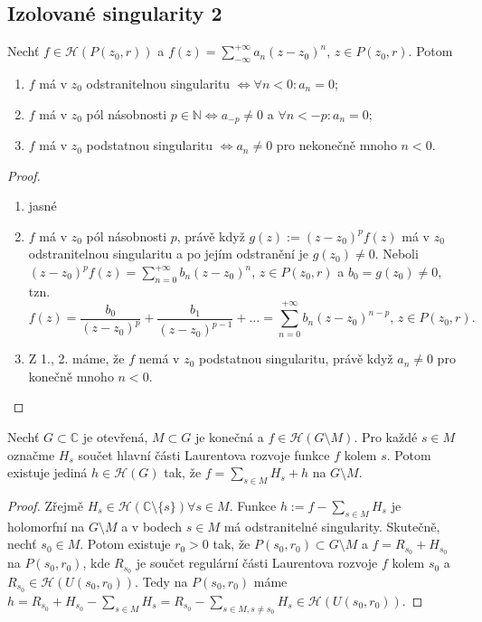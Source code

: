 \subsection{Izolované singularity 2}
\begin{theorem}
Nechť $f \in \mathcal{H}(P(z_0,r))$ a $f(z)=\sum\limits_{-\infty}^{+\infty}a_n(z-z_0)^n$, $z \in P(z_0,r)$. Potom
\begin{enumerate}
    \item $f$ má v $z_0$ odstranitelnou singularitu $\Leftrightarrow \forall n<0: a_n=0$; 
    \item $f$ má v $z_0$ pól násobnosti $p \in \mathbb{N}\Leftrightarrow a_{-p} \neq 0$ a $\forall n<-p: a_n=0$; 
    \item $f$ má v $z_0$ podstatnou singularitu $\Leftrightarrow a_n \neq 0$ pro nekonečně mnoho $n<0$.
\end{enumerate}
\end{theorem}

\begin{proof}
\begin{enumerate}
    \item jasné
    \item $f$ má v $z_0$ pól násobnosti $p$, právě když $g(z):=(z-z_0)^pf(z)$ má v $z_0$ odstranitelnou singularitu a po jejím odstranění je $g(z_0) \neq 0$. Neboli $(z-z_0)^pf(z)=\sum\limits_{n=0}^{+\infty}b_n(z-z_0)^n$, $z \in P(z_0,r)$ a $b_0=g(z_0) \neq 0$, tzn. 
    $$
    f(z)=\frac{b_0}{(z-z_0)^p}+\frac{b_1}{(z-z_0)^{p-1}}+ \dots=\sum\limits_{n=0}^{+\infty}b_n(z-z_0)^{n-p} \text{, } z \in P(z_0,r)\text{.}
    $$
    \item Z 1., 2. máme, že $f$ nemá v $z_0$ podstatnou singularitu, právě když $a_n \neq 0$ pro konečně mnoho $n<0$.
\end{enumerate}
\end{proof}

\begin{theorem}
Nechť $G \subset \mathbb{C}$ je otevřená, $M \subset G$ je konečná a $f \in \mathcal{H}(G \setminus M)$. Pro každé $s \in M$ označme $H_s$ součet hlavní části Laurentova rozvoje funkce $f$ kolem $s$. Potom existuje jediná $h \in \mathcal{H}(G)$ tak, že $f=\sum\limits_{s\in M} H_s+h$ na $G \setminus M$.
\end{theorem}
\begin{proof}
Zřejmě $H_s \in \mathcal{H}(\mathbb{C} \setminus \{s \}) \forall s \in M$. Funkce $h:=f-\sum\limits_{s\in M} H_s$ je holomorfní na $G \setminus M$ a v bodech $s \in M$ má odstranitelné singularity. Skutečně, nechť $s_0 \in M$. Potom existuje $r_0>0$ tak, že $P(s_0,r_0) \subset G \setminus M$ a $f=R_{s_0}+H_{s_0}$ na $P(s_0,r_0)$, kde $R_{s_0}$ je součet regulární části Laurentova rozvoje $f$ kolem $s_0$ a $R_{s_0}\in \mathcal{H}(U(s_0,r_0))$. Tedy na $P(s_0,r_0)$ máme $h=R_{s_0}+H_{s_0}-\sum\limits_{s\in M} H_s=R_{s_0}-\sum\limits_{s\in M, s \neq s_0} H_s \in \mathcal{H}(U(s_0,r_0))$.
\end{proof}

